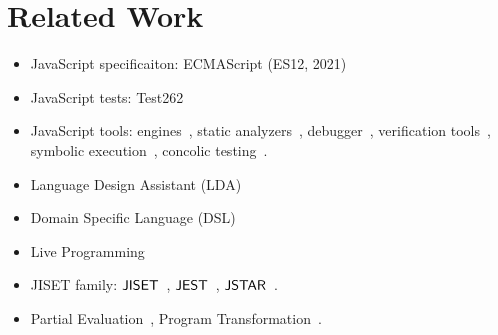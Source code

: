 \section{Related Work}\label{sec:related}

\begin{itemize}
  \item JavaScript specificaiton: ECMAScript (ES12, 2021)~\cite{es12}
  \item JavaScript tests: Test262~\cite{test262}
  \item JavaScript tools: engines~\cite{v8, jscore, chakra, spidermonkey},
    static analyzers~\cite{safe, safe2, tajs, wala, jsai},
    debugger~\cite{jsexplain}, verification tools~\cite{javert, javert2,
    ad-safety, javanni}, symbolic execution~\cite{symbolic-js, sym-js, expo-se},
    concolic testing~\cite{jalangi, type-conc-test}.
  \item Language Design Assistant (LDA)~\cite{lda, lisa, ipld, asf-sdf,
    meta-env, faustine}
  \item Domain Specific Language (DSL)~\cite{dsl-survey, dsl-survey2}
  \item Live Programming~\cite{omnicode, situ-vis, proj-box}
  \item JISET family: $\jiset$~\cite{jiset}, $\jest$~\cite{jest}, $\jstar$~\cite{jstar}.
  \item Partial Evaluation~\cite{peval, peval-survey}, Program
    Transformation~\cite{trans-ai}.
\end{itemize}

\todo
